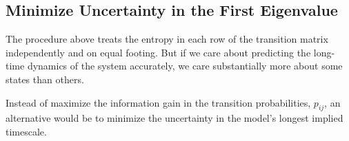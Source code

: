 \documentclass[twocolumn,floatfix,nofootinbib,aps]{revtex4-1}
\begin{document}
\subsection{Minimize Uncertainty in the First Eigenvalue}

The procedure above treats the entropy in each row of the transition matrix independently and on equal footing. But if we care about predicting the long-time dynamics of the system accurately, we care substantially more about some states than others.

Instead of maximize the information gain in the transition probabilities, $p_{ij}$, an alternative would be to minimize the uncertainty in the model's longest implied timescale.
\end{document}
